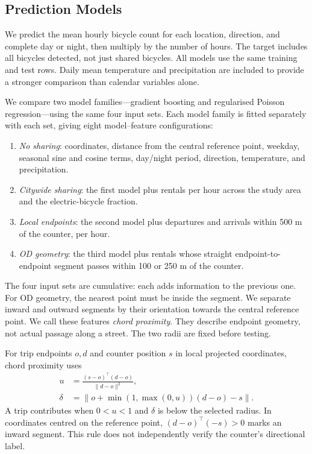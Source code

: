 \documentclass{interact}
\begin{document}
\subsection{Prediction Models}
We predict the mean hourly bicycle count for each location, direction, and complete day or night, then multiply by the number of hours. The target includes all bicycles detected, not just shared bicycles. All models use the same training and test rows. Daily mean temperature and precipitation are included to provide a stronger comparison than calendar variables alone.

We compare two model families---gradient boosting and regularised Poisson regression---using the same four input sets. Each model family is fitted separately with each set, giving eight model--feature configurations:
\begin{enumerate}
\item \emph{No sharing}: coordinates, distance from the central reference point, weekday, seasonal sine and cosine terms, day/night period, direction, temperature, and precipitation.
\item \emph{Citywide sharing}: the first model plus rentals per hour across the study area and the electric-bicycle fraction.
\item \emph{Local endpoints}: the second model plus departures and arrivals within 500 m of the counter, per hour.
\item \emph{OD geometry}: the third model plus rentals whose straight endpoint-to-endpoint segment passes within 100 or 250 m of the counter.
\end{enumerate}
The four input sets are cumulative: each adds information to the previous one. For OD geometry, the nearest point must be inside the segment. We separate inward and outward segments by their orientation towards the central reference point. We call these features \emph{chord proximity}. They describe endpoint geometry, not actual passage along a street. The two radii are fixed before testing.

For trip endpoints $o,d$ and counter position $s$ in local projected coordinates, chord proximity uses
\begin{equation}
 \begin{aligned}
 u&=\frac{(s-o)^\top(d-o)}{\|d-o\|^2},\\
 \delta&=\|o+\min(1,\max(0,u))(d-o)-s\|.
 \end{aligned}
\end{equation}
A trip contributes when $0<u<1$ and $\delta$ is below the selected radius. In coordinates centred on the reference point, $(d-o)^\top(-s)>0$ marks an inward segment. This rule does not independently verify the counter's directional label.
\end{document}
